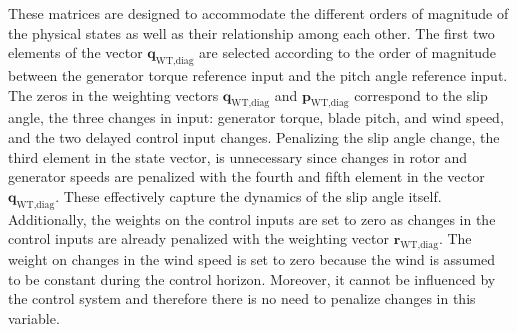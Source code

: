 These matrices are designed to accommodate the different orders of magnitude of the physical states as well as their relationship among each other. The first two elements of the vector $\bm{q}_{\text{WT,diag}}$ are selected according to the order of magnitude between the generator torque reference input and the pitch angle reference input. The zeros in the weighting vectors $\bm{q}_{\text{WT,diag}}$ and $\bm{p}_{\text{WT,diag}}$ correspond to the slip angle, the three changes in input: generator torque, blade pitch, and wind speed, and the two delayed control input changes. Penalizing the slip angle change, the third element in the state vector, is unnecessary since changes in rotor and generator speeds are penalized with the fourth and fifth element in the vector $\bm{q}_{\text{WT,diag}}$. These effectively capture the dynamics of the slip angle itself. Additionally, the weights on the control inputs are set to zero as changes in the control inputs are already penalized with the weighting vector $\bm{r}_{\text{WT,diag}}$. The weight on changes in the wind speed is set to zero because the wind is assumed to be constant during the control horizon. Moreover, it cannot be influenced by the control system and therefore there is no need to penalize changes in this variable. 

